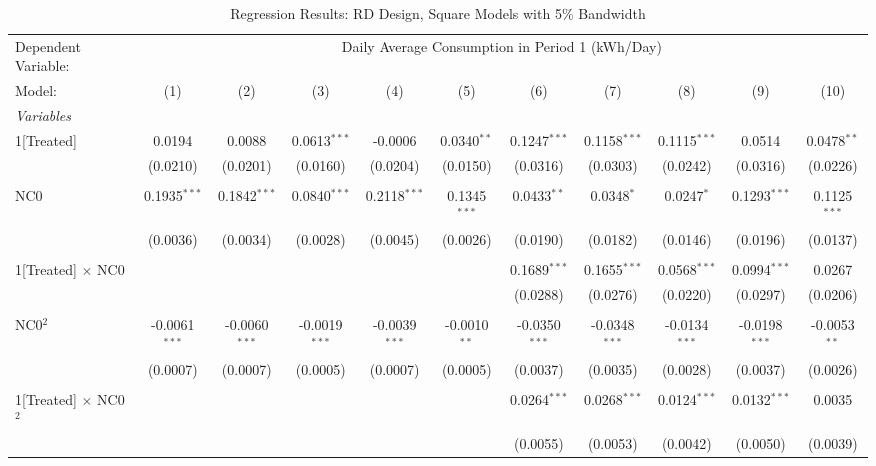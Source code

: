 \begin{table}[htbp]
\centering
\caption{\label{Table:Regression-Results_RD_Square_BW-5} Regression Results: RD Design, Square Models with 5\% Bandwidth}
\begin{adjustbox}{scale = 0.75}
\begin{tabular}{lcccccccccc}
\tabularnewline\toprule\toprule
Dependent Variable:&\multicolumn{10}{c}{Daily Average Consumption in Period 1 (kWh/Day)}\\
Model:&(1) & (2) & (3) & (4) & (5) & (6) & (7) & (8) & (9) & (10)\\
\midrule
\emph{Variables}&   &   &   &   &   &   &   &   &   &  \\
1[Treated]&0.0194 & 0.0088 & 0.0613$^{***}$ & -0.0006 & 0.0340$^{**}$ & 0.1247$^{***}$ & 0.1158$^{***}$ & 0.1115$^{***}$ & 0.0514 & 0.0478$^{**}$\\
  &(0.0210) & (0.0201) & (0.0160) & (0.0204) & (0.0150) & (0.0316) & (0.0303) & (0.0242) & (0.0316) & (0.0226)\\
&   &   &   &   &   &   &   &   &   &  \\
NC0&0.1935$^{***}$ & 0.1842$^{***}$ & 0.0840$^{***}$ & 0.2118$^{***}$ & 0.1345$^{***}$ & 0.0433$^{**}$ & 0.0348$^{*}$ & 0.0247$^{*}$ & 0.1293$^{***}$ & 0.1125$^{***}$\\
  &(0.0036) & (0.0034) & (0.0028) & (0.0045) & (0.0026) & (0.0190) & (0.0182) & (0.0146) & (0.0196) & (0.0137)\\
&   &   &   &   &   &   &   &   &   &  \\
1[Treated] $\times $ NC0&   &    &    &    &    & 0.1689$^{***}$ & 0.1655$^{***}$ & 0.0568$^{***}$ & 0.0994$^{***}$ & 0.0267\\
  &   &    &    &    &    & (0.0288) & (0.0276) & (0.0220) & (0.0297) & (0.0206)\\
&   &   &   &   &   &   &   &   &   &  \\
NC0$^2$&-0.0061$^{***}$ & -0.0060$^{***}$ & -0.0019$^{***}$ & -0.0039$^{***}$ & -0.0010$^{**}$ & -0.0350$^{***}$ & -0.0348$^{***}$ & -0.0134$^{***}$ & -0.0198$^{***}$ & -0.0053$^{**}$\\
  &(0.0007) & (0.0007) & (0.0005) & (0.0007) & (0.0005) & (0.0037) & (0.0035) & (0.0028) & (0.0037) & (0.0026)\\
&   &   &   &   &   &   &   &   &   &  \\
1[Treated] $\times $ NC0$^2$&   &    &    &    &    & 0.0264$^{***}$ & 0.0268$^{***}$ & 0.0124$^{***}$ & 0.0132$^{***}$ & 0.0035\\
  &   &    &    &    &    & (0.0055) & (0.0053) & (0.0042) & (0.0050) & (0.0039)\\

\end{tabular}
\end{adjustbox}
\end{table}
